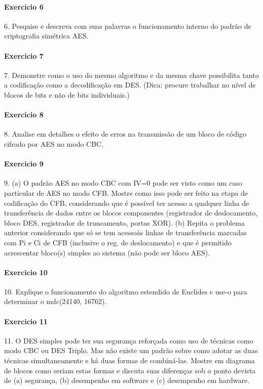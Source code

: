 \documentclass[10pt,a4paper]{report}
\begin{document}
\paragraph{Exercicio 6}
6. Pesquise e descreva com suas palavras o funcionamento interno do padrão de criptografia simétrica AES.
\paragraph{Exercicio 7}
7. Demonstre como o uso do mesmo algoritmo e da mesma chave possibilita tanto a codificação como a decodificação em DES. (Dica: procure trabalhar no nível de blocos de bits e não de bits individuais.)
\paragraph{Exercicio 8}
8. Analise em detalhes o efeito de erros na transmissão de um bloco de código cifrado por AES no modo CBC.
\paragraph{Exercicio 9}
9. (a) O padrão AES no modo CBC com IV=0 pode ser visto como um caso particular de AES no modo CFB. Mostre como isso pode ser feito na etapa de codificação do CFB, considerando que é possível ter acesso a qualquer linha de transferência de dados entre os blocos componentes (registrador de deslocamento, bloco DES, registrador de truncamento, portas XOR).
(b) Repita o problema anterior considerando que só se tem acessoàs linhas de transferência marcadas com Pi e Ci de CFB (inclusive o reg. de deslocamento) e que é permitido acrescentar bloco(s) simples ao sistema (não pode ser bloco AES).
\paragraph{Exercicio 10}
10. Explique o funcionamento do algoritmo estendido de Euclides e use-o para determinar o mdc(24140, 16762).
\paragraph{Exercicio 11}
11. O DES simples pode ter sua segurança reforçada como uso de técnicas como modo CBC ou DES Triplo. Mas não existe um padrão sobre como adotar as duas técnicas simultaneamente e há duas formas de combiná-las. Mostre em diagrama de blocos como seriam estas formas e discuta suas diferenças sob o ponto devista de (a) segurança, (b) desempenho em software e (c) desempenho em hardware.
\end{document}
